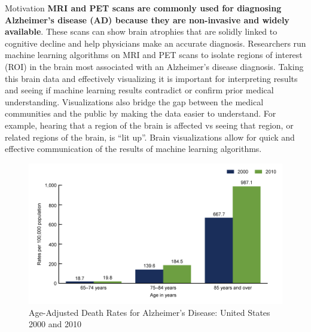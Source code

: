 \documentclass[final]{beamer}
\newlength{\onecolwid}
\begin{document}
\begin{frame}[t]
\begin{columns}[t]
\begin{column}{\onecolwid}
\begin{alertblock}{Motivation}
            \textbf{MRI and PET scans are commonly used for diagnosing Alzheimer’s disease (AD) because they are non-invasive and widely available}. These scans can show brain atrophies that are solidly linked to cognitive decline and help physicians make an accurate diagnosis. Researchers run machine learning algorithms on MRI and PET scans to isolate regions of interest (ROI) in the brain most associated with an Alzheimer’s disease diagnosis. Taking this brain data and effectively visualizing it is important for interpreting results and seeing if machine learning results contradict or confirm prior medical understanding. Visualizations also bridge the gap between the medical communities and the public by making the data easier to understand. For example, hearing that a region of the brain is affected vs seeing that region, or related regions of the brain, is “lit up”. Brain visualizations allow for quick and effective communication of the results of machine learning algorithms.
            \vspace{1cm}
            \begin{figure}
                \includegraphics[width=1.0\textwidth,keepaspectratio]{images/alzRate.PNG}
                \caption{Age-Adjusted Death Rates for Alzheimer's Disease: United States 2000 and 2010}\label{imageLabel}
           \end{figure}
        
        \end{alertblock}
        
        

        
            


\end{column}
\end{columns}
\end{frame}
\end{document}
